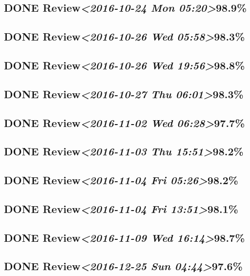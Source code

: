 \documentclass[11pt]{ctexart}
\begin{document}
\subsection{{\bfseries\sffamily DONE} Review\textit{<2016-10-24 Mon 05:20>}98.9\%}
\label{sec:org9c898a2}
\subsection{{\bfseries\sffamily DONE} Review\textit{<2016-10-26 Wed 05:58>}98.3\%}
\label{sec:org56e5549}
\subsection{{\bfseries\sffamily DONE} Review\textit{<2016-10-26 Wed 19:56>}98.8\%}
\label{sec:orga57f1bb}
\subsection{{\bfseries\sffamily DONE} Review\textit{<2016-10-27 Thu 06:01>}98.3\%}
\label{sec:org6e1fb08}
\subsection{{\bfseries\sffamily DONE} Review\textit{<2016-11-02 Wed 06:28>}97.7\%}
\label{sec:org8766cc1}
\subsection{{\bfseries\sffamily DONE} Review\textit{<2016-11-03 Thu 15:51>}98.2\%}
\label{sec:org8eeb02e}
\subsection{{\bfseries\sffamily DONE} Review\textit{<2016-11-04 Fri 05:26>}98.2\%}
\label{sec:org3d825f4}
\subsection{{\bfseries\sffamily DONE} Review\textit{<2016-11-04 Fri 13:51>}98.1\%}
\label{sec:org74f6720}
\subsection{{\bfseries\sffamily DONE} Review\textit{<2016-11-09 Wed 16:14>}98.7\%}
\label{sec:orgd57474e}
\subsection{{\bfseries\sffamily DONE} Review\textit{<2016-12-25 Sun 04:44>}97.6\%}
\label{sec:org1ba0933}
\end{document}
